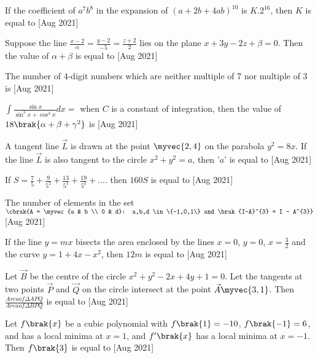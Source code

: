 \iffalse
  \title{August:2021}
  \author{AI24BTECH11016}
  \section{fitb}
\fi
\item 
    If the coefficient of $a^{7}b^{8}$ in the expansion of $(a + 2b + 4ab)^{10}$ is $K.2^{16}$, then $K$ is equal to
    \hfill [Aug 2021]
    \item
	Suppose the line $\frac{x-2}{\alpha} = \frac{y-2}{-5} = \frac{z+2}{2}$ lies on the plane  $x + 3y - 2z + \beta = 0$. Then the value of $\alpha + \beta$ is equal to 
	\hfill [Aug 2021]
	\item 
	The number of 4-digit numbers which are neither multiple of 7 nor multiple of 3 is 
	\hfill [Aug 2021]
	\item 
	$\int \frac{\sin{x}}{\sin^3{x} + \cos^3{x}} dx =$ when $C$ is a constant of integration, then the value of $18\brak{\alpha+\beta+\gamma^{2}}$ is
	\hfill [Aug 2021]
	\item
	A tangent line $\vec{L}$ is drawn at the point $\myvec{2 , 4}$ on the parabola $y^{2}= 8x$. If the line $\vec{L}$ is also tangent to the circle $x^2 + y^2 = a$, then '$a$' is equal to
	\hfill [Aug 2021]
	\item 
	If $S=\frac{7}{5} + \frac{9}{5^{2}} + \frac{13}{5^{3}} + \frac{19}{5^{4}} + ....$ then $160S$ is equal to 
	\hfill [Aug 2021]
	\item 
	The number of elements in the set  \\
	
	$\cbrak{A = \myvec{a & b \\ 0 & d}: a,b,d \in \{-1,0,1\} and \brak{I-A}^{3} = I - A^{3}}$
	\hfill [Aug 2021]
	\item 
	If the line $y = mx$ bisects the area enclosed by the lines $x = 0$, $y = 0$, $x = \frac{3}{2}$ and the curve $y = 1 + 4x - x^{2}$, then $12m$ is equal to 
	\hfill [Aug 2021]
	\item 
	Let $\vec{B}$ be the centre of the circle $x^2+ y^2 - 2x + 4y + 1 = 0$. Let the tangents at two points $\vec{P}$ and $\vec{Q}$ on the circle intersect at the point $\vec{A}\myvec{3 , 1}$. Then $\frac{Area of \Delta APQ}{Area of \Delta BPQ}$ is equal to
	\hfill [Aug 2021]
	\item 
 	Let $f\brak{x}$ be a cubic polynomial with $f\brak{1} = -10$, $f\brak{-1} = 6$, and has a local minima at $x = 1$, and $f^{\prime}\brak{x}$ has a local minima at $x = -1$. Then $f\brak{3}$ is equal to 
 	\hfill [Aug 2021]
